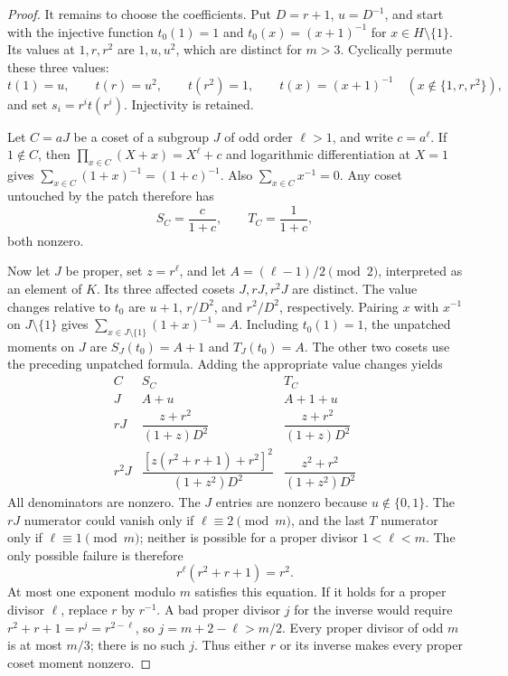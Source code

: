 \begin{proof}
It remains to choose the coefficients.  Put $D=r+1$, $u=D^{-1}$, and start
with the injective function $t_0(1)=1$ and
$t_0(x)=(x+1)^{-1}$ for $x\in H\setminus\{1\}$.  Its values at
$1,r,r^2$ are $1,u,u^2$, which are distinct for $m>3$.  Cyclically permute
these three values:
\[
 t(1)=u,\qquad t(r)=u^2,\qquad t(r^2)=1,
 \qquad t(x)=(x+1)^{-1}\quad(x\notin\{1,r,r^2\}),
\]
and set $s_i=r^i t(r^i)$.  Injectivity is retained.

Let $C=aJ$ be a coset of a subgroup $J$ of odd order $\ell>1$, and write
$c=a^\ell$.  If $1\notin C$, then
$\prod_{x\in C}(X+x)=X^\ell+c$ and logarithmic differentiation at $X=1$
gives $\sum_{x\in C}(1+x)^{-1}=(1+c)^{-1}$.  Also
$\sum_{x\in C}x^{-1}=0$.  Any coset untouched by the patch therefore has
\[
 S_C=\frac{c}{1+c},\qquad T_C=\frac1{1+c},
\]
both nonzero.

Now let $J$ be proper, set $z=r^\ell$, and let
$A=(\ell-1)/2\pmod2$, interpreted as an element of $K$.  Its three
affected cosets $J,rJ,r^2J$ are distinct.  The value changes relative to
$t_0$ are $u+1$, $r/D^2$, and $r^2/D^2$, respectively.  Pairing
$x$ with $x^{-1}$ on $J\setminus\{1\}$ gives
$\sum_{x\in J\setminus\{1\}}(1+x)^{-1}=A$.  Including
$t_0(1)=1$, the unpatched moments on $J$ are $S_J(t_0)=A+1$ and
$T_J(t_0)=A$.  The other two cosets use the preceding unpatched formula.
Adding the appropriate value changes yields
\[
\begin{array}{c|cc}
 C&S_C&T_C\\ \hline
 J&A+u&A+1+u\\[2pt]
 rJ&\dfrac{z+r^2}{(1+z)D^2}&\dfrac{z+r^2}{(1+z)D^2}\\[8pt]
 r^2J&\dfrac{[z(r^2+r+1)+r^2]^2}{(1+z^2)D^2}
      &\dfrac{z^2+r^2}{(1+z^2)D^2}
\end{array}
\]
All denominators are nonzero.  The $J$ entries are nonzero because
$u\notin\{0,1\}$.  The $rJ$ numerator could vanish only if
$\ell\equiv2\pmod m$, and the last $T$ numerator only if
$\ell\equiv1\pmod m$; neither is possible for a proper divisor
$1<\ell<m$.  The only possible failure is therefore
\begin{equation}\label{eq:bad-three-point-coset}
 r^\ell(r^2+r+1)=r^2.
\end{equation}
At most one exponent modulo $m$ satisfies this equation.  If it holds for
a proper divisor $\ell$, replace $r$ by $r^{-1}$.  A bad proper divisor
$j$ for the inverse would require
$r^2+r+1=r^j=r^{2-\ell}$, so
$j=m+2-\ell>m/2$.  Every proper divisor of odd $m$ is at most $m/3$;
there is no such $j$.  Thus either $r$ or its inverse makes every proper
coset moment nonzero.


\end{proof}
